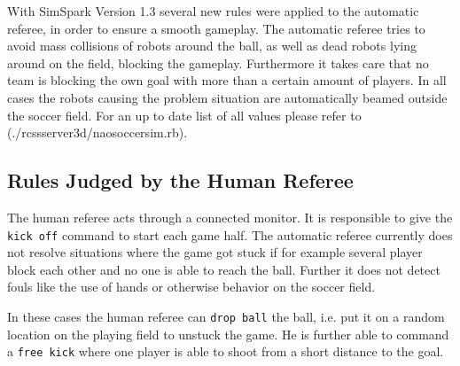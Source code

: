 With SimSpark Version 1.3 several new rules were applied to the automatic
referee, in order to ensure a smooth gameplay. 
The automatic referee tries to avoid mass collisions of robots around the ball,
as well as dead robots lying around on the field, blocking the gameplay.
Furthermore it takes care that no team is blocking the own goal with more than
a certain amount of players. In all cases the robots causing the problem
situation are automatically beamed outside the soccer field. For an up to date
list of all values please refer to (./rcssserver3d/naosoccersim.rb).





\subsection{Rules Judged by the Human Referee}

The human referee acts through a connected monitor. It is responsible
to give the \texttt{kick off} command to start each game half. The
automatic referee currently does not resolve situations where the game
got stuck if for example several player block each other and no one is
able to reach the ball. Further it does not detect fouls like the use
of hands or otherwise behavior on the soccer field.

In these cases the human referee can \texttt{drop ball} the ball,
i.e. put it on a random location on the playing field to unstuck the
game. He is further able to command a \texttt{free kick} where one
player is able to shoot from a short distance to the goal.



